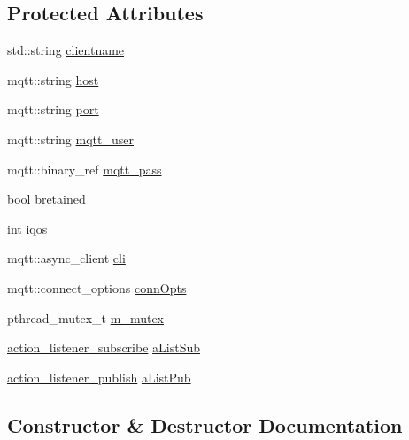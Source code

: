 \subsection*{Protected Attributes}
\begin{DoxyCompactItemize}
\item 
std\+::string \hyperlink{classft_1_1_txt_mqtt_factory_client_a22be9e9d3b627a159aced6ae6bdffcc2}{clientname}
\item 
mqtt\+::string \hyperlink{classft_1_1_txt_mqtt_factory_client_aa927ee53f42359598d014b334c064d83}{host}
\item 
mqtt\+::string \hyperlink{classft_1_1_txt_mqtt_factory_client_af60c5887f1eae5dc4039fa284eb2b0b6}{port}
\item 
mqtt\+::string \hyperlink{classft_1_1_txt_mqtt_factory_client_ab4c4b9312d3df970892ae26c143eb5ff}{mqtt\+\_\+user}
\item 
mqtt\+::binary\+\_\+ref \hyperlink{classft_1_1_txt_mqtt_factory_client_abb1d5f2fd93c87710ad4ea57d3d6702b}{mqtt\+\_\+pass}
\item 
bool \hyperlink{classft_1_1_txt_mqtt_factory_client_a057a4b3e05359993f4e591dfac65e56a}{bretained}
\item 
int \hyperlink{classft_1_1_txt_mqtt_factory_client_a63fa34c118f67674e0afb96ca3af1408}{iqos}
\item 
mqtt\+::async\+\_\+client \hyperlink{classft_1_1_txt_mqtt_factory_client_a39b8ca61026e78a31ea72c82964fd2ad}{cli}
\item 
mqtt\+::connect\+\_\+options \hyperlink{classft_1_1_txt_mqtt_factory_client_a39f8ad4996bb34b7acbfd063f8f68a91}{conn\+Opts}
\item 
pthread\+\_\+mutex\+\_\+t \hyperlink{classft_1_1_txt_mqtt_factory_client_adb54c5156c67a8caec9e482e2d1c6e70}{m\+\_\+mutex}
\item 
\hyperlink{classft_1_1action__listener__subscribe}{action\+\_\+listener\+\_\+subscribe} \hyperlink{classft_1_1_txt_mqtt_factory_client_a881a48419f359ee94ee6731e742ffb66}{a\+List\+Sub}
\item 
\hyperlink{classft_1_1action__listener__publish}{action\+\_\+listener\+\_\+publish} \hyperlink{classft_1_1_txt_mqtt_factory_client_ad384e6f4dd23d4470bbf47d2ade13195}{a\+List\+Pub}
\end{DoxyCompactItemize}


\subsection{Constructor \& Destructor Documentation}

